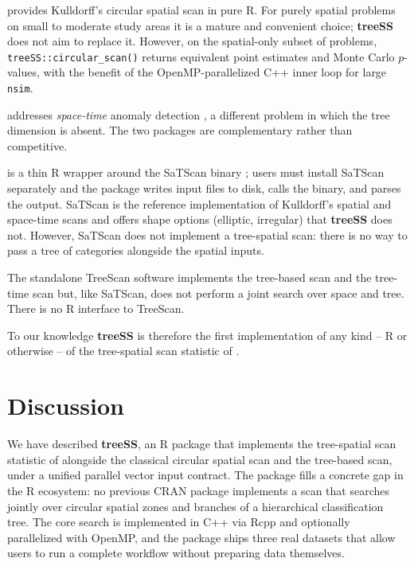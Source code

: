  provides Kulldorff's circular spatial scan in pure R.
For purely spatial problems on small to moderate study areas it is a
mature and convenient choice; \textbf{treeSS} does not aim to replace it.
However, on the spatial-only subset of problems, \texttt{treeSS::circular\_scan()}
returns equivalent point estimates and Monte Carlo \(p\)-values, with the
benefit of the OpenMP-parallelized C++ inner loop for large \texttt{nsim}.

 addresses \emph{space-time} anomaly detection
\citep{scanstatistics}, a different problem in which the tree dimension is
absent. The two packages are complementary rather than competitive.

 is a thin R wrapper around the SaTScan binary
\citep{satscan}; users must install SaTScan separately and the package writes
input files to disk, calls the binary, and parses the output. SaTScan is
the reference implementation of Kulldorff's spatial and space-time scans
and offers shape options (elliptic, irregular) that \textbf{treeSS} does not.
However, SaTScan does not implement a tree-spatial scan: there is no way
to pass a tree of categories alongside the spatial inputs.

The standalone TreeScan software \citep{treescan} implements the tree-based
scan and the tree-time scan but, like SaTScan, does not perform a joint
search over space and tree. There is no R interface to TreeScan.

To our knowledge \textbf{treeSS} is therefore the first implementation of any
kind -- R or otherwise -- of the tree-spatial scan statistic of
\citet{cancado2025}.

\hypertarget{sec-discussion}{%
\section{Discussion}\label{sec-discussion}}

We have described \textbf{treeSS}, an R package that implements the
tree-spatial scan statistic of \citet{cancado2025} alongside the classical
circular spatial scan and the tree-based scan, under a unified parallel
vector input contract. The package fills a concrete gap in the R
ecosystem: no previous CRAN package implements a scan that searches
jointly over circular spatial zones and branches of a hierarchical
classification tree. The core search is implemented in C++ via Rcpp and
optionally parallelized with OpenMP, and the package ships three real
datasets that allow users to run a complete workflow without preparing
data themselves.

